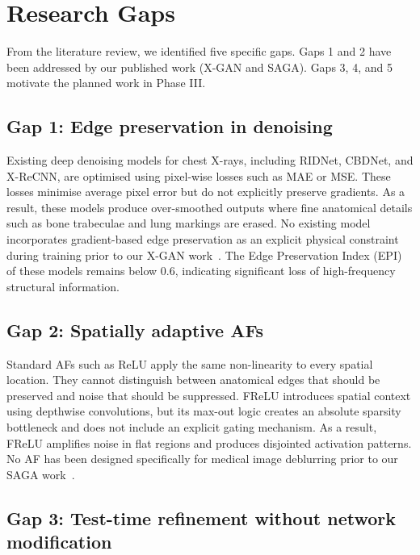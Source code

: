 
\section{Research Gaps}
\label{sec:rg}

From the literature review, we identified five specific gaps. Gaps 1 and 2 have been addressed by our published work (X-GAN and SAGA). Gaps 3, 4, and 5 motivate the planned work in Phase III.

\subsection{Gap 1: Edge preservation in denoising}

Existing deep denoising models for chest X-rays, including RIDNet, CBDNet, and X-ReCNN, are optimised using pixel-wise losses such as MAE or MSE. These losses minimise average pixel error but do not explicitly preserve gradients. As a result, these models produce over-smoothed outputs where fine anatomical details such as bone trabeculae and lung markings are erased. No existing model incorporates gradient-based edge preservation as an explicit physical constraint during training prior to our X-GAN work~\citep{siju2026xgan}. The Edge Preservation Index (EPI) of these models remains below 0.6, indicating significant loss of high-frequency structural information.

\subsection{Gap 2: Spatially adaptive AFs}

Standard AFs such as ReLU apply the same non-linearity to every spatial location. They cannot distinguish between anatomical edges that should be preserved and noise that should be suppressed. FReLU introduces spatial context using depthwise convolutions, but its max-out logic creates an absolute sparsity bottleneck and does not include an explicit gating mechanism. As a result, FReLU amplifies noise in flat regions and produces disjointed activation patterns. No AF has been designed specifically for medical image deblurring prior to our SAGA work~\citep{siju2026saga}.

\subsection{Gap 3: Test-time refinement without network modification}

